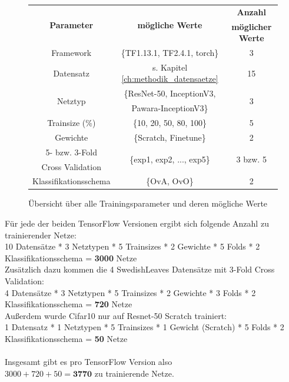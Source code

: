 \begin{figure}[H]
\begin{tabular}{|c|c|c|}
\hline 
\multirow{2}{*}{\textbf{Parameter}} & \multirow{2}{*}{\textbf{mögliche Werte}} & \textbf{Anzahl} \\ 
& & \textbf{möglicher Werte} \\
\hline 
Framework & \{TF1.13.1, TF2.4.1, torch\} & 3\\
\hline
Datensatz & s. Kapitel \ref{ch:methodik_datensaetze} & 15\\
\hline 
\multirow{2}{*}{Netztyp} & \{ResNet-50, InceptionV3, & \multirow{2}{*}{3} \\
 & Pawara-InceptionV3\} & \\
\hline
Trainsize (\%) & \{10, 20, 50, 80, 100\}& 5 \\
\hline
Gewichte & \{Scratch, Finetune\} & 2 \\
\hline
5- bzw. 3-Fold & \multirow{2}{*}{\{exp1, exp2, ..., exp5\}} & \multirow{2}{*}{3 bzw. 5} \\
Cross Validation & & \\
\hline
Klassifikationsschema & \{OvA, OvO\} & 2 \\
\hline
\end{tabular} 
\caption{Übersicht über alle Trainingsparameter und deren mögliche Werte}
\label{tab:parameterUebersicht}
\end{figure}

Für jede der beiden TensorFlow \cite{tensorflow} Versionen ergibt sich folgende Anzahl zu trainierender Netze:\\
\begin{adjustbox}{width=\textwidth, center}
10 Datensätze * 3 Netztypen * 5 Trainsizes * 2 Gewichte * 5 Folds * 2 Klassifikationsschema = \textbf{3000} Netze\\
\end{adjustbox}
Zusätzlich dazu kommen die 4 SwedishLeaves \cite{swedishLeaves} Datensätze mit 3-Fold Cross Validation:\\
\begin{adjustbox}{width=\textwidth, center}
4 Datensätze * 3 Netztypen * 5 Trainsizes * 2 Gewichte * 3 Folds * 2 Klassifikationsschema = \textbf{720} Netze\\
\end{adjustbox}
Außerdem wurde Cifar10 \cite{cifar10} nur auf Resnet-50 Scratch trainiert:\\
\begin{adjustbox}{width=\textwidth, center}
1 Datensatz * 1 Netztypen * 5 Trainsizes * 1 Gewicht (Scratch) * 5 Folds * 2 Klassifikationsschema = \textbf{50} Netze\\
\end{adjustbox}
\\
Insgesamt gibt es pro TensorFlow \cite{tensorflow} Version also\\
$3000 + 720 + 50 = \textbf{3770}$ zu trainierende Netze.\\\\

